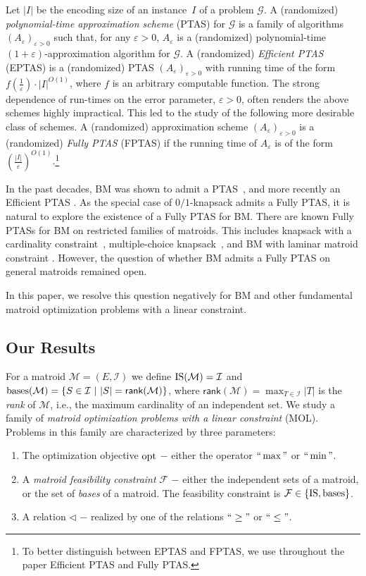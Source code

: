 \documentclass[11pt,letter]{article}
\newcommand{\opt}{\textnormal{opt}}
\newcommand{\bases}{\textnormal{bases}}
\newcommand{\IS}{\textnormal{IS}}
\newcommand{\cG}{{\mathcal{G}}}
\newcommand{\cI}{{\mathcal{I}}}
\newcommand{\cm}{{\mathcal{M}}}
\newcommand{\cF}{{\mathcal{F}}}
\newcommand{\eps}{{\varepsilon}}
\begin{document}
	
	
	
	Let $|I|$ be the encoding size of an instance~$I$ of a problem $\cG$. 
	A (randomized) {\em polynomial-time approximation scheme} (PTAS)
	for $\cG$ is a family of algorithms $(A_{\eps})_{\eps>0}$ such that, for any $\eps>0$, $A_{\eps}$ is a (randomized) polynomial-time $(1+ \eps)$-approximation algorithm for $\cG$. 
	A (randomized) {\em Efficient PTAS} (EPTAS) is a (randomized) PTAS $(A_{\eps})_{\eps>0}$ with running time of the form $f\left(\frac{1}{\eps}\right) \cdot |I|^{O(1)}$, where $f$ is an arbitrary computable function. %
	The strong dependence of run-times on the error parameter, $\eps > 0$, often renders the above schemes highly impractical. This led to the study of the following more desirable class of schemes. A (randomized) approximation scheme 
	$(A_{\eps})_{\eps>0}$ is a (randomized) {\em Fully PTAS} (FPTAS) if the running time of $A_{\eps}$ is of the form $ {\left(\frac{|I|}{\eps}\right)}^{O(1)}$.\footnote{To better distinguish between EPTAS and FPTAS, we use throughout the paper Efficient PTAS and Fully PTAS.}
	
In the past decades, BM was shown to admit a PTAS~\cite{BBGS11,CVZ11,GZ10}, and more recently an Efficient PTAS \cite{DKS23,DKS23b}. As the special case of
$0/1${\sc-knapsack} admits a Fully PTAS, it is natural to explore the existence of a Fully PTAS for BM. There are known Fully PTASs  for BM on restricted families of matroids. This includes {\sc knapsack with a cardinality constraint}~\cite{caprara2000approximation}, 
{\sc multiple-choice knapsack}~\cite{La79}, and {\sc BM with laminar matroid constraint} \cite{DKS23c}. However, the question of whether BM admits a Fully PTAS on general matroids remained open. 

In this paper, we resolve this question negatively for BM and other fundamental matroid optimization problems with a linear constraint. 

\subsection{Our Results}

For a matroid $\cm = (E,\cI)$ we define $\IS(\cm) = \cI$ and $\bases(\cm) = \{S \in \cI~|~|S| = \textsf{rank}(\cm)\}$, where $\textsf{rank}(\cm) = \max_{T \in \cI} |T|$ is the {\em rank} of $\cm$, i.e., the maximum cardinality of an independent set. We study a family of {\em matroid optimization problems with a linear constraint} (MOL). Problems in this family are characterized by three parameters: 
\begin{enumerate}
\item[(i)]
The optimization objective $\opt$ $-$ either the operator $``\max"$ or $``\min"$. 
\item[(ii)]
A {\em matroid feasibility constraint} $\cF$ $-$ either the independent sets of a matroid, or the set of {\em bases} of a matroid. The feasibility constraint is $\cF \in \{\IS,\bases\}$.
\item[(iii)]
A relation $\triangleleft$ $-$  realized by one of the relations $``\geq"$ or $``\leq"$. 
\end{enumerate}
\end{document}
